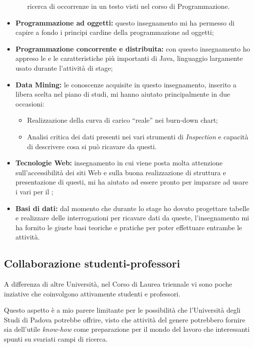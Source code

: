 \begin{itemize}
\begin{itemize}
    ricerca di occorrenze in un testo visti nel corso di Programmazione.
  \end{itemize}
\item \textbf{Programmazione ad oggetti:} questo insegnamento mi ha permesso
  di capire a fondo i principi cardine della programmazione ad oggetti;
\item \textbf{Programmazione concorrente e distribuita:} con questo
  insegnamento ho appreso le  e le caratteristiche più
  importanti di Java, linguaggio largamente usato durante l'attività di stage;
\item \textbf{Data Mining:} le conoscenze acquisite in questo insegnamento,
  inserito a libera scelta nel piano di studi, mi hanno aiutato principalmente
  in due occasioni:
  \begin{itemize}
  \item Realizzazione della curva di carico ``reale'' nei burn-down chart;
  \item Analisi critica dei dati presenti nei vari strumenti di
    \emph{Inspection} e capacità di descrivere cosa si può ricavare da questi.
  \end{itemize}
\item \textbf{Tecnologie Web:} insegnamento in cui viene posta molta attenzione
  sull'accessibilità dei siti Web e sulla buona realizzazione di struttura e
  presentazione di questi, mi ha aiutato ad essere pronto per imparare ad
  usare i vari  per il \FREND;
\item \textbf{Basi di dati:} dal momento che durante lo stage ho dovuto
  progettare tabelle e realizzare delle interrogazioni per ricavare dati da
  queste, l'insegnamento mi ha fornito le giuste basi teoriche e pratiche per
  poter effettuare entrambe le attività.
\end{itemize}

\subsection{Collaborazione studenti-professori}

A differenza di altre Università, nel Corso di Laurea triennale vi sono poche
inziative che coinvolgono attivamente studenti e professori.

Questo aspetto è a mio parere limitante per le possibilità che l'Università
degli Studi di Padova potrebbe offrire, visto che attività del genere
potrebbero fornire sia dell'utile \emph{know-how} come preparazione per il
mondo del lavoro che interessanti spunti su svariati campi di ricerca.

